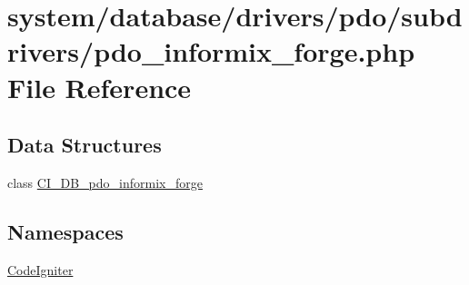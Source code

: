 \hypertarget{pdo__informix__forge_8php}{}\section{system/database/drivers/pdo/subdrivers/pdo\+\_\+informix\+\_\+forge.php File Reference}
\label{pdo__informix__forge_8php}
\subsection*{Data Structures}
\begin{DoxyCompactItemize}
\item 
class \mbox{\hyperlink{class_c_i___d_b__pdo__informix__forge}{C\+I\+\_\+\+D\+B\+\_\+pdo\+\_\+informix\+\_\+forge}}
\end{DoxyCompactItemize}
\subsection*{Namespaces}
\begin{DoxyCompactItemize}
\item 
 \mbox{\hyperlink{namespace_code_igniter}{Code\+Igniter}}
\end{DoxyCompactItemize}
